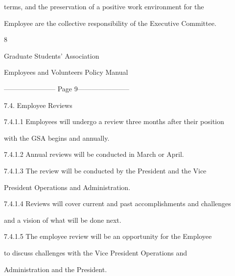 terms,      and      the  preservation  of  a  positive  work  environment  for  the  

Employee are the collective responsibility of the Executive Committee.  



                                                         8  

  

  

                                   Graduate  Students’ Association  



                          Employees and Volunteers Policy Manual  


----------------------- Page 9-----------------------

                         7.4.      Employee Reviews  



7.4.1.1 Employees will undergo  a review three months  after their position      

with the GSA begins and annually.  



  



7.4.1.2 Annual reviews will be conducted in March or April.  



  



7.4.1.3  The  review   will  be   conducted  by  the   President   and   the   Vice  

          President Operations and Administration.  



  



7.4.1.4 Reviews will cover current and past accomplishments and challenges  

          and a vision of what will be done next.  



  



7.4.1.5 The   employee   review   will  be   an   opportunity   for   the   Employee   

          to      discuss   challenges   with   the   Vice   President   Operations   and  

          Administration and the President.  



